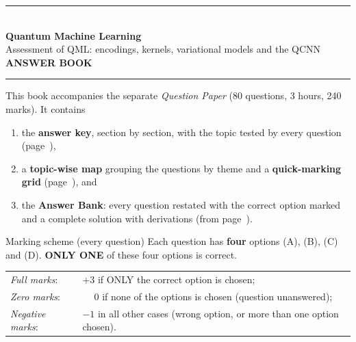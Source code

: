 \documentclass[11pt,a4paper]{article}
\begin{document}
\pagestyle{fancy}\fancyhf{}
\renewcommand{\headrulewidth}{0.4pt}

\thispagestyle{empty}
\begin{center}
{\color{brand}\rule{\linewidth}{1.2pt}}\\[6pt]
{\Huge\bfseries\color{brand} Quantum Machine Learning}\\[4pt]
{\Large Assessment of QML: encodings, kernels, variational models and the QCNN}\\[4pt]
{\large\bfseries ANSWER BOOK}\\[2pt]
{\color{brand}\rule{\linewidth}{1.2pt}}
\end{center}
This book accompanies the separate \emph{Question Paper} (80 questions, 3 hours, 240 marks). It contains
\begin{enumerate}[leftmargin=1.4em, itemsep=0pt, topsep=2pt]
\item the \textbf{answer key}, section by section, with the topic tested by every question (page~\pageref{key}),
\item a \textbf{topic-wise map} grouping the questions by theme and a \textbf{quick-marking grid} (page~\pageref{topicmap}), and
\item the \textbf{Answer Bank}: every question restated with the correct option marked \textcolor{okgreen}{} and a
      complete solution with derivations (from page~\pageref{bank}).
\end{enumerate}
\begin{infobox}{Marking scheme (every question)}
Each question has \textbf{four} options (A), (B), (C) and (D). \textbf{ONLY ONE} of these four options is correct.\\[2pt]
\begin{tabular}{@{}ll@{}}
\emph{Full marks}: & $+3$ if ONLY the correct option is chosen;\\
\emph{Zero marks}: & $\phantom{+}0$ if none of the options is chosen (question unanswered);\\
\emph{Negative marks}: & $-1$ in all other cases (wrong option, or more than one option chosen).
\end{tabular}
\end{infobox}
\end{document}
